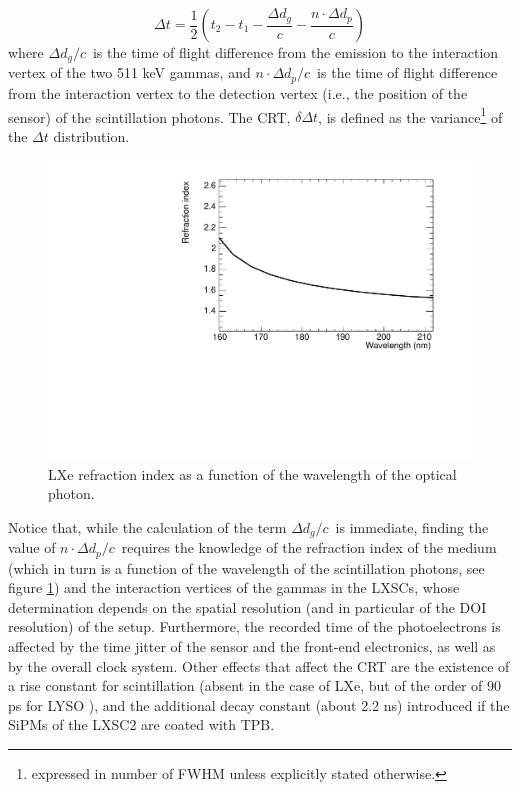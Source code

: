 \documentclass[11pt,a4paper]{article}
\begin{document}
\begin{equation}
\Delta t = \frac{1}{2}(t_2 - t_1 - \frac{\Delta d_g}{c} - \frac{n \cdot \Delta d_p}{c}) 
\label{eq.CRT}
\end{equation}
%
where $\Delta d_g/c$~is the time of flight difference from the emission to the interaction vertex of the two 511 keV gammas, and $n \cdot \Delta d_p/c$~is the time of flight difference from the interaction vertex to the
detection vertex (i.e., the position of the sensor) of the scintillation photons. The CRT,
$\delta \Delta t$, is defined as the variance\footnote{expressed in number of FWHM unless explicitly stated otherwise.} of the $\Delta t$ distribution. 

\begin{figure}[!bhtp]
	\centering
	\includegraphics[scale=0.6]{img/LXe_n_lambda.pdf}
	\caption{\label{fig.nlambda} LXe refraction index as a function of the wavelength of the optical photon.}
\end{figure}


Notice that, while the calculation of the term $\Delta d_g/c$~is immediate, finding the value
of $n \cdot \Delta d_p/c$~requires the knowledge of the refraction index of the medium (which in turn is a function of the wavelength of the scintillation photons, see figure \ref{fig.nlambda}) and the interaction vertices of the gammas in the LXSCs, whose determination depends on the spatial resolution (and in particular of the DOI resolution) of the setup. Furthermore, the recorded time of the photoelectrons is affected by the time jitter of the sensor and the front-end electronics, as well as by the overall clock system. Other effects that affect the CRT are the existence of a rise constant for scintillation (absent in the case of LXe, but of the order of 90 ps for LYSO \cite{Seifert}), and the additional decay constant (about 2.2 ns) introduced if the SiPMs of the LXSC2 are coated with TPB. 
\end{document}
